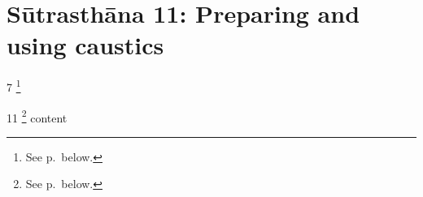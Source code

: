 \chapter{Sūtrasthāna 11: Preparing and using caustics}
\label{kṣārapāka}

\begin{translation}
    \item[7]
    \footnote{See p.\,\pageref{karṇika} below.}
    \item[11]
    \footnote{See p.\,\pageref{kṣārapāka2} below.}
    content
\end{translation}